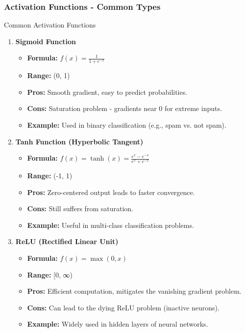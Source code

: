 \documentclass[aspectratio=169]{beamer}
\begin{document}
\begin{frame}[fragile]
    \frametitle{Activation Functions - Common Types}
    \begin{block}{Common Activation Functions}
        \begin{enumerate}
            \item \textbf{Sigmoid Function}
            \begin{itemize}
                \item \textbf{Formula:} \( f(x) = \frac{1}{1 + e^{-x}} \)
                \item \textbf{Range:} (0, 1)
                \item \textbf{Pros:} Smooth gradient, easy to predict probabilities.
                \item \textbf{Cons:} Saturation problem - gradients near 0 for extreme inputs.
                \item \textbf{Example:} Used in binary classification (e.g., spam vs. not spam).
            \end{itemize}
            
            \item \textbf{Tanh Function (Hyperbolic Tangent)}
            \begin{itemize}
                \item \textbf{Formula:} \( f(x) = \tanh(x) = \frac{e^{x} - e^{-x}}{e^{x} + e^{-x}} \)
                \item \textbf{Range:} (-1, 1)
                \item \textbf{Pros:} Zero-centered output leads to faster convergence.
                \item \textbf{Cons:} Still suffers from saturation.
                \item \textbf{Example:} Useful in multi-class classification problems.
            \end{itemize}
            
            \item \textbf{ReLU (Rectified Linear Unit)}
            \begin{itemize}
                \item \textbf{Formula:} \( f(x) = \max(0, x) \)
                \item \textbf{Range:} [0, ∞)
                \item \textbf{Pros:} Efficient computation, mitigates the vanishing gradient problem.
                \item \textbf{Cons:} Can lead to the dying ReLU problem (inactive neurons).
                \item \textbf{Example:} Widely used in hidden layers of neural networks.
            \end{itemize}
        \end{enumerate}
    \end{block}
\end{frame}
\end{document}
